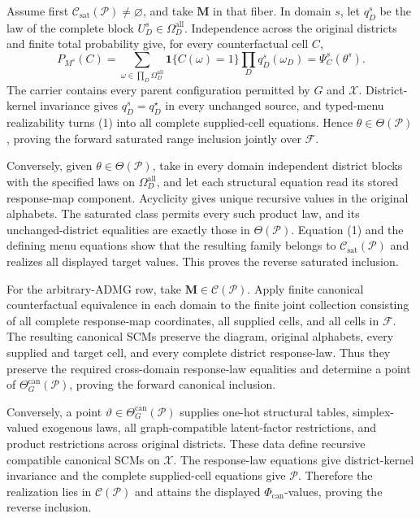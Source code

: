 Assume first \(\mathcal C_{\mathrm{sat}}(\mathcal P)\ne\varnothing\), and take \(\mathbf M\) in that fiber.  In domain \(s\), let \(q_D^s\) be the law of the complete block \(U_D^s\in\Omega_D^{\mathrm{all}}\).  Independence across the original districts and finite total probability give, for every counterfactual cell \(C\),
\[
P_{M^s}(C)=
\sum_{\omega\in\prod_D\Omega_D^{\mathrm{all}}}
\mathbf 1\{C(\omega)=1\}\prod_Dq_D^s(\omega_D)
=\Psi_C^s(\theta^s).
\tag{1}
\]
The carrier contains every parent configuration permitted by \(G\) and \(\mathcal X\).  District-kernel invariance gives \(q_D^s=q_D^\star\) in every unchanged source, and typed-menu realizability turns (1) into all complete supplied-cell equations.  Hence \(\theta\in\Theta(\mathcal P)\), proving the forward saturated range inclusion jointly over \(\mathcal F\).

Conversely, given \(\theta\in\Theta(\mathcal P)\), take in every domain independent district blocks with the specified laws on \(\Omega_D^{\mathrm{all}}\), and let each structural equation read its stored response-map component.  Acyclicity gives unique recursive values in the original alphabets.  The saturated class permits every such product law, and its unchanged-district equalities are exactly those in \(\Theta(\mathcal P)\).  Equation (1) and the defining menu equations show that the resulting family belongs to \(\mathcal C_{\mathrm{sat}}(\mathcal P)\) and realizes all displayed target values.  This proves the reverse saturated inclusion.

For the arbitrary-ADMG row, take \(\mathbf M\in\mathcal C(\mathcal P)\).  Apply finite canonical counterfactual equivalence in each domain to the finite joint collection consisting of all complete response-map coordinates, all supplied cells, and all cells in \(\mathcal F\).  The resulting canonical SCMs preserve the diagram, original alphabets, every supplied and target cell, and every complete district response-law.  Thus they preserve the required cross-domain response-law equalities and determine a point of \(\Theta_G^{\mathrm{can}}(\mathcal P)\), proving the forward canonical inclusion.

Conversely, a point \(\vartheta\in\Theta_G^{\mathrm{can}}(\mathcal P)\) supplies one-hot structural tables, simplex-valued exogenous laws, all graph-compatible latent-factor restrictions, and product restrictions across original districts.  These data define recursive compatible canonical SCMs on \(\mathcal X\).  The response-law equations give district-kernel invariance and the complete supplied-cell equations give \(\mathcal P\).  Therefore the realization lies in \(\mathcal C(\mathcal P)\) and attains the displayed \(\Phi_{\mathrm{can}}\)-values, proving the reverse inclusion.

